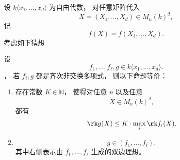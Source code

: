 


设 $k\langle x_1,\dots,x_d\rangle$ 为自由代数， 
对任意矩阵代入 \[ X=(X_1,\dots,X_d)\in M_n(k)^d, \] 
记 \[ f(X)=f(X_1,\dots,X_d). \] 考虑如下猜想
\begin{conj} 
设 \[ f_1,\dots,f_\ell,g\in k\langle x_1,\dots,x_d\rangle. \] ， 若 $f_i,g$ 都是齐次非交换多项式， 则以下命题等价： \begin{enumerate} \item[(i)] 存在常数 $K\in\mathbb N$， 使得对任意 $n$ 以及任意 \[ X\in M_n(k)^d, \] 都有 \[ \rk g(X) \le K\cdot \max_i \rk f_i(X). \] \item[(ii)] \[ g\in (f_1,\dots,f_\ell), \] 其中右侧表示由 $f_1,\dots,f_\ell$ 生成的双边理想。 \end{enumerate}
\end{conj} 



